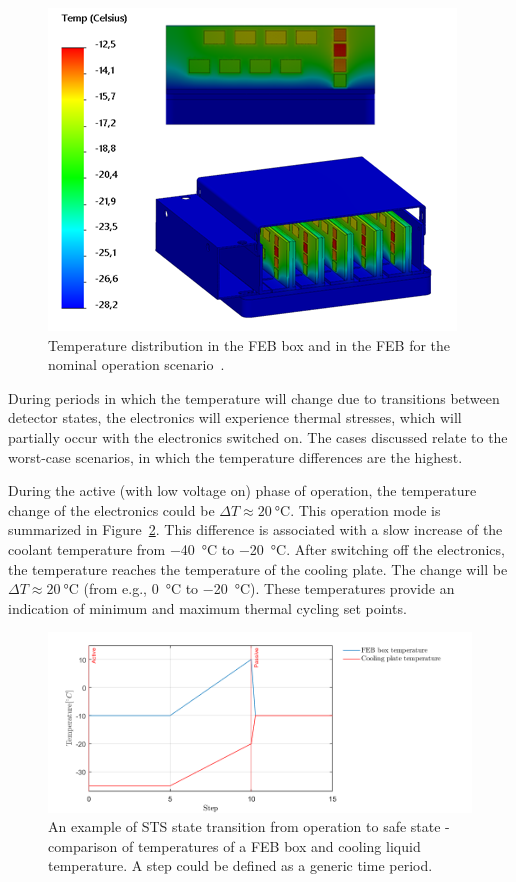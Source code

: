 \newpage

\begin{figure}[!h]
\centering
\includegraphics[width=0.62\columnwidth]{Chapter4/images/nominal_febs.png}
\caption{Temperature distribution in the \gls{FEB} box and in the \gls{FEB} for the nominal operation scenario~\cite{Agarwal}.}
\label{fig_nominal_febs}
\end{figure}


During periods in which the temperature will change due to transitions between detector states, the electronics will experience thermal stresses, which will partially occur with the electronics switched on. The cases discussed relate to the worst-case scenarios, in which the temperature differences are the highest. 

During the active (with low voltage on) phase of operation, the temperature change of the electronics could be $\Delta T \approx \SI{20}{\celsius}$. This operation mode is summarized in Figure~\ref{fig_nominal_scenario}.  This difference is associated with a slow increase of the coolant temperature from \SI{-40}{\celsius} to \SI{-20}{\celsius}. After switching off the electronics, the temperature reaches the temperature of the cooling plate. The change will be $\Delta T \approx \SI{20}{\celsius}$ (from e.g., \SI{0}{\celsius} to \SI{-20}{\celsius}). These temperatures provide an indication of minimum and maximum thermal cycling set points.  

\begin{figure}[!h]
\centering
\includegraphics[width=0.85\columnwidth]{Chapter4/images/nominal_all.png}
\caption{An example of \gls{STS} state transition from operation to safe state - comparison of temperatures of a \gls{FEB} box and cooling liquid temperature. A step could be defined as a generic time period.}
\label{fig_nominal_scenario}
\end{figure}


